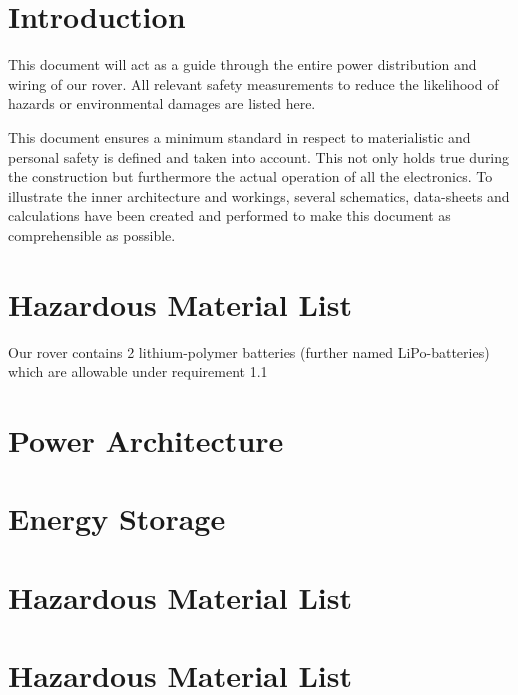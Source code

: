 \section{Introduction}

This document will act as a guide through the entire power distribution and wiring of our rover. All relevant safety measurements to reduce the likelihood of hazards or environmental damages are listed here. 

This document ensures a minimum standard in respect to materialistic and personal safety is defined and taken into account. This not only holds true during the construction but furthermore the actual operation of all the electronics. To illustrate the inner architecture and workings, several schematics, data-sheets and calculations have been created and performed to make this document as comprehensible as possible. 

\section{Hazardous Material List}

Our rover contains 2 lithium-polymer batteries (further named LiPo-batteries) which are
allowable under requirement 1.1 %

\section{Power Architecture}

\section{Energy Storage}
\section{Hazardous Material List}
\section{Hazardous Material List}


